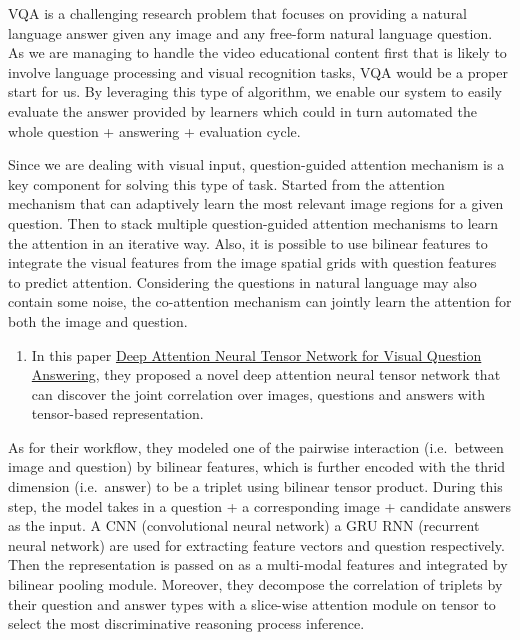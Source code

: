 \documentclass[]{book}
\providecommand{\tightlist}{%
  \setlength{\itemsep}{0pt}\setlength{\parskip}{0pt}}
\theoremstyle{definition}
\theoremstyle{definition}
\theoremstyle{definition}
\theoremstyle{remark}
\begin{document}
VQA is a challenging research problem that focuses on providing a
natural language answer given any image and any free-form natural
language question. As we are managing to handle the video educational
content first that is likely to involve language processing and visual
recognition tasks, VQA would be a proper start for us. By leveraging
this type of algorithm, we enable our system to easily evaluate the
answer provided by learners which could in turn automated the whole
question + answering + evaluation cycle.

Since we are dealing with visual input, question-guided attention
mechanism is a key component for solving this type of task. Started from
the attention mechanism that can adaptively learn the most relevant
image regions for a given question. Then to stack multiple
question-guided attention mechanisms to learn the attention in an
iterative way. Also, it is possible to use bilinear features to
integrate the visual features from the image spatial grids with question
features to predict attention. Considering the questions in natural
language may also contain some noise, the co-attention mechanism can
jointly learn the attention for both the image and question.

\begin{enumerate}
\def\labelenumi{\arabic{enumi}.}
\tightlist
\item
  In this paper
  \href{http://openaccess.thecvf.com/content_ECCV_2018/papers/Yalong_Bai_Deep_Attention_Neural_ECCV_2018_paper.pdf}{Deep
  Attention Neural Tensor Network for Visual Question Answering}, they
  proposed a novel deep attention neural tensor network that can
  discover the joint correlation over images, questions and answers with
  tensor-based representation.
\end{enumerate}

As for their workflow, they modeled one of the pairwise interaction
(i.e.~between image and question) by bilinear features, which is further
encoded with the thrid dimension (i.e.~answer) to be a triplet using
bilinear tensor product. During this step, the model takes in a question
+ a corresponding image + candidate answers as the input. A CNN
(convolutional neural network) a GRU RNN (recurrent neural network) are
used for extracting feature vectors and question respectively. Then the
representation is passed on as a multi-modal features and integrated by
bilinear pooling module. Moreover, they decompose the correlation of
triplets by their question and answer types with a slice-wise attention
module on tensor to select the most discriminative reasoning process
inference.
\end{document}
